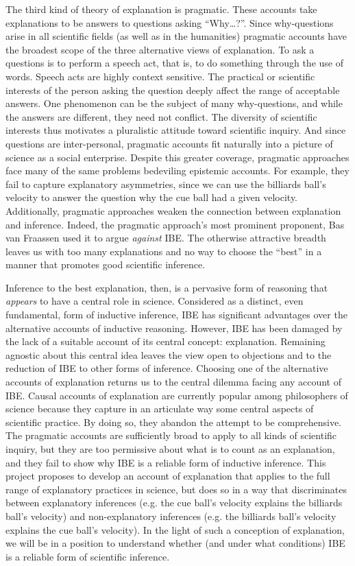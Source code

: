 \documentclass{article}[11pt]
\begin{document}
The third kind of theory of explanation is pragmatic.  These accounts take explanations to be answers to questions asking ``Why\dots ?''. Since why-questions arise in all scientific fields (as well as in the humanities)  pragmatic accounts  have the broadest scope of the three alternative views of explanation.  To ask a questions is to perform a speech act, that is, to do something through the use of words.  Speech acts are highly context sensitive. The practical or scientific interests of the person asking the question deeply affect the range of acceptable answers. One phenomenon can be the subject of many why-questions, and while the answers are different, they need not conflict. The diversity of scientific interests thus motivates a pluralistic attitude toward scientific inquiry.  And since questions are inter-personal, pragmatic accounts fit naturally into a picture of science as a social enterprise.  Despite this greater coverage, pragmatic approaches face many of the same problems bedeviling epistemic accounts.  For example, they fail to capture explanatory asymmetries, since we can use the billiards ball's velocity to answer the question why the cue ball had a given velocity. Additionally, pragmatic approaches weaken the connection between explanation and inference. Indeed, the pragmatic approach's most prominent proponent, Bas van Fraassen \parencite*{Fraassen1980} used it to argue \textit{against} IBE. The otherwise attractive breadth leaves us with too many explanations and no way to choose the ``best'' in a manner that promotes good scientific inference.

Inference to the best explanation, then, is a pervasive form of reasoning that \textit{appears} to have a central role in science.  Considered as a distinct, even fundamental, form of inductive inference, IBE has significant advantages over the alternative accounts of inductive reasoning.  However, IBE has been damaged by the lack of a suitable account of its central concept: explanation.  Remaining agnostic about this central idea leaves the view open to objections and to the reduction of IBE to other forms of inference.  Choosing one of the alternative accounts of explanation returns us to the central dilemma facing any account of IBE.  Causal accounts of explanation are currently popular among philosophers of science because they capture in an articulate way some central aspects of scientific practice.  By doing so, they abandon the attempt to be comprehensive.  The pragmatic accounts are sufficiently broad to apply to all kinds of scientific inquiry, but they are too permissive about what is to count as an explanation, and they fail to show why IBE is a reliable form of inductive inference.  This project proposes to develop an account of explanation that applies to the full range of explanatory practices in science, but does so in a way that discriminates between explanatory inferences (e.g. the cue ball's velocity explains the billiards ball's velocity) and non-explanatory inferences (e.g. the billiards ball's velocity explains the cue ball's velocity).  In the light of such a conception of explanation, we will be in a position to understand  whether (and under what conditions) IBE is a reliable form of scientific inference.
\end{document}

